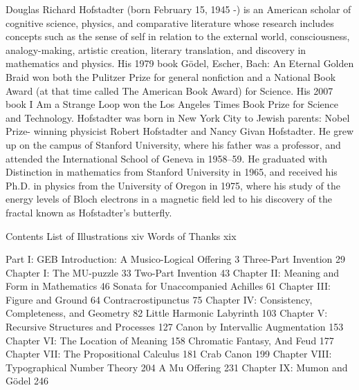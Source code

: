 
Douglas Richard Hofstadter (born February 15, 1945 -) is an American
scholar of cognitive science, physics, and comparative literature whose
research includes concepts such as the sense of self in relation to the
external world, consciousness, analogy-making, artistic creation, literary
translation, and discovery in mathematics and physics. His 1979 book
Gödel, Escher, Bach: An Eternal Golden Braid won both the Pulitzer Prize
for general nonfiction and a National Book Award (at that time called The
American Book Award) for Science. His 2007 book I Am a Strange Loop
won the Los Angeles Times Book Prize for Science and Technology.
Hofstadter was born in New York City to Jewish parents: Nobel Prize-
winning physicist Robert Hofstadter and Nancy Givan Hofstadter. He
grew up on the campus of Stanford University, where his father was a
professor, and attended the International School of Geneva in 1958–59. He
graduated with Distinction in mathematics from Stanford University in
1965, and received his Ph.D. in physics from the University of Oregon in
1975, where his study of the energy levels of Bloch electrons in a magnetic
field led to his discovery of the fractal known as Hofstadter's butterfly.




                                    Contents
List of Illustrations                                         xiv
Words of Thanks                                               xix

Part I: GEB
        Introduction: A Musico-Logical Offering               3
               Three-Part Invention                           29
        Chapter I: The MU-puzzle                              33
               Two-Part Invention                             43
        Chapter II: Meaning and Form in Mathematics           46
               Sonata for Unaccompanied Achilles              61
        Chapter III: Figure and Ground                        64
               Contracrostipunctus                            75
        Chapter IV: Consistency, Completeness, and Geometry   82
               Little Harmonic Labyrinth                      103
        Chapter V: Recursive Structures and Processes         127
               Canon by Intervallic Augmentation              153
        Chapter VI: The Location of Meaning                   158
               Chromatic Fantasy, And Feud                    177
        Chapter VII: The Propositional Calculus               181
               Crab Canon                                     199
        Chapter VIII: Typographical Number Theory             204
               A Mu Offering                                  231
        Chapter IX: Mumon and Gödel                           246





